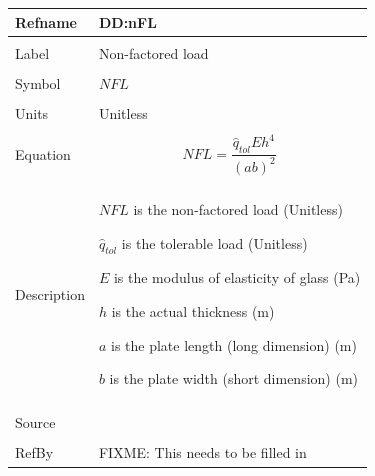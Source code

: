 \documentclass[12pt]{article}
\begin{document}
\noindent \begin{minipage}{\textwidth}
\begin{tabular}{p{} p{}}
\toprule \textbf{Refname} & \textbf{DD:nFL}
\label{DD:nFL}
\\ \midrule \\
Label & Non-factored load
\\ \midrule \\
Symbol & $NFL$
\\ \midrule \\
Units & Unitless
\\ \midrule \\
Equation & \begin{dmath}
           NFL=\frac{{\hat{q}_{tol}} E h^{4}}{\left(a b\right)^{2}}
           \end{dmath}
\\ \midrule \\
Description & \begin{symbDescription}
              \item{$NFL$ is the non-factored load (Unitless)}
              \item{${\hat{q}_{tol}}$ is the tolerable load (Unitless)}
              \item{$E$ is the modulus of elasticity of glass (Pa)}
              \item{$h$ is the actual thickness (m)}
              \item{$a$ is the plate length (long dimension) (m)}
              \item{$b$ is the plate width (short dimension) (m)}
              \end{symbDescription}
\\ \midrule \\
Source & 
\\ \midrule \\
RefBy & FIXME: This needs to be filled in
\\ \bottomrule \end{tabular}
\end{minipage}\\
~\newline
\end{document}
